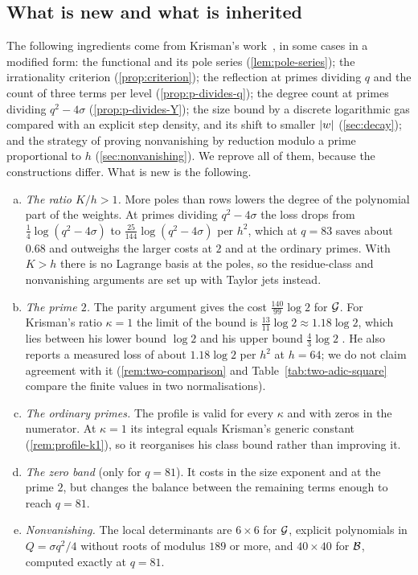\subsection{What is new and what is inherited}\label{subsec:new}

The following ingredients come from Krisman's work~\cite{Krisman2026chi2}, in some cases in a
modified form: the functional and its pole series (\cref{lem:pole-series}); the irrationality
criterion (\cref{prop:criterion}); the reflection at primes dividing $q$ and the count of three
terms per level (\cref{prop:p-divides-q}); the degree count at primes dividing $q^2-4\sigma$
(\cref{prop:p-divides-Y}); the size bound by a discrete logarithmic gas compared with an explicit
step density, and its shift to smaller $\left\lvert w\right\rvert$ (\cref{sec:decay}); and the strategy of proving
nonvanishing by reduction modulo a prime proportional to $h$ (\cref{sec:nonvanishing}). We reprove
all of them, because the constructions differ. What is new is the following.
\begin{enumerate}[(a)]
\item \emph{The ratio $K/h>1$.} More poles than rows lowers the degree of the polynomial part of
the weights. At primes dividing $q^2-4\sigma$ the loss drops from $\frac14\log(q^2-4\sigma)$ to
$\frac{25}{144}\log(q^2-4\sigma)$ per $h^2$, which at $q=83$ saves about $0.68$ and outweighs the
larger costs at $2$ and at the ordinary primes. With $K>h$ there is no Lagrange basis at the
poles, so the residue-class and nonvanishing arguments are set up with Taylor jets instead.
\item \emph{The prime $2$.} The parity argument gives the cost $\frac{140}{99}\log2$ for $\mathcal{G}$.
For Krisman's ratio $\kappa=1$ the limit of the bound is $\frac{13}{11}\log2\approx1.18\log2$,
which lies between his lower bound $\log2$ and his upper bound $\frac43\log2$
\cite[Lemma~11.1, Prop.~11.2]{Krisman2026chi2}. He also reports a measured loss of about
$1.18\log2$ per $h^2$ at $h=64$; we do not claim agreement with it (\cref{rem:two-comparison} and
Table~\ref{tab:two-adic-square} compare the finite values in two normalisations).
\item \emph{The ordinary primes.} The profile is valid for every $\kappa$ and with zeros in the
numerator. At $\kappa=1$ its integral equals Krisman's generic constant (\cref{rem:profile-k1}),
so it reorganises his class bound rather than improving it.
\item \emph{The zero band} (only for $q=81$). It costs in the size exponent and at the prime $2$,
but changes the balance between the remaining terms enough to reach $q=81$.
\item \emph{Nonvanishing.} The local determinants are $6\times6$ for $\mathcal{G}$, explicit
polynomials in $Q=\sigma q^2/4$ without roots of modulus $189$ or more, and $40\times40$ for
$\mathcal{B}$, computed exactly at $q=81$.
\end{enumerate}

